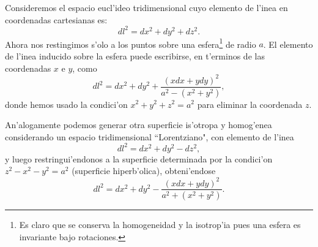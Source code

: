Consideremos el espacio eucl'ideo tridimensional cuyo elemento de l'inea en coordenadas cartesianas es:
\begin{equation}
dl^{2}= dx^{2} + dy^{2} + dz^{2}.
\end{equation}
Ahora nos restingimos s'olo a los puntos sobre una esfera\footnote{Es claro que se conserva la homogeneidad y la isotrop'ia pues una esfera es invariante bajo rotaciones.} de radio $a$. El elemento de l'inea inducido sobre la esfera puede escribirse, en t'erminos de las coordenadas $x$ e $y$, como
\begin{equation}
dl^{2}= dx^{2} + dy^{2} + \frac{(xdx + ydy)^{2}}{a^2-(x^2 + y^2)},
\end{equation}
donde hemos usado la condici'on $x^2 +y^2 + z^2 =a^2$ para eliminar la coordenada $z$.

An'alogamente podemos generar otra superficie is'otropa y homog'enea considerando un espacio tridimensional ``Lorentziano", con elemento de l'inea
\begin{equation}
dl^{2}= dx^{2} + dy^{2}  -dz^{2},
\end{equation}
y luego restringui'endonos a la superficie determinada por la condici'on $z^2-x^2-y^2=a^2$ (superficie hiperb'olica), obteni'endose
\begin{equation}
dl^{2}= dx^{2} + dy^{2} - \frac{(xdx + ydy)^{2}}{a^2+(x^2 + y^2)}.
\end{equation}

